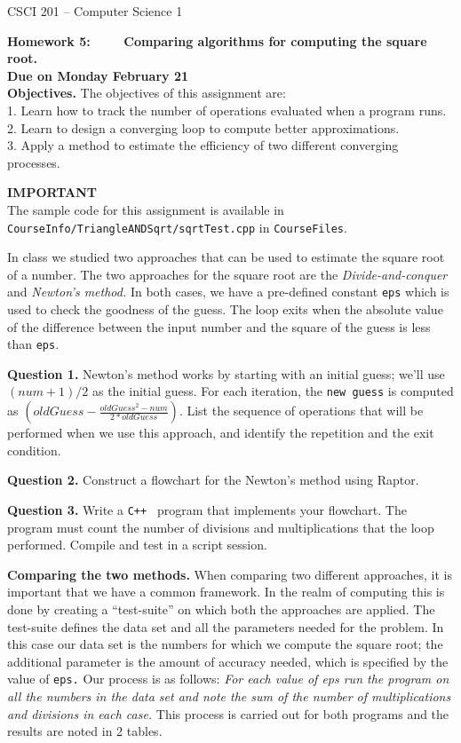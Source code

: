 \documentclass[11pt, psfig]{article}
\begin{document}


{\Large CSCI 201 -- Computer Science 1}



{\bf Homework 5:  \ \ \ \   Comparing algorithms for computing the square root.}\\
{\bf Due on Monday February 21}\\
{\bf Objectives.} {The objectives of this assignment are: \\ 1. Learn how to track the number of operations evaluated when a program runs.\\ 2. Learn to design a converging loop to compute better approximations. \\
3. Apply a method to estimate the efficiency of two different converging processes.} 

{\bf IMPORTANT} \\{ 
The sample code for this assignment is available in {\tt CourseInfo/TriangleANDSqrt/sqrtTest.cpp} in {\tt CourseFiles}.}

In class we studied two approaches that can be used to 
estimate the square root of a number.  
The two approaches for the square root are the {\em 
Divide-and-conquer} and {\em Newton's method.} In both cases, we have a 
pre-defined constant {\tt eps} which is used to check the goodness 
of the guess. The loop exits when the absolute value of the 
difference between the input number and the square of the guess is 
less than {\tt eps}.  

 
{\bf Question 1.} Newton's method works by starting with an initial guess; we'll use $(num+1)/2$ as the initial guess.
For each iteration,  the {\tt new guess} is computed as 
$(oldGuess - \frac{oldGuess^2-num}{2*oldGuess})$. List the sequence of operations 
that will be performed when we use this approach, and identify the repetition and 
the exit condition.

{\bf Question 2.} Construct a flowchart for the Newton's method using Raptor.


{\bf Question 3.}  Write a {\tt C++ } program that implements your
flowchart. The program must count the number of 
divisions and multiplications that the loop performed. Compile and test in a script session.

{\bf Comparing the   two methods.}  When comparing 
two different approaches, it is important that we have a common framework.
In the realm of computing this is done by creating a ``test-suite'' on 
which both the approaches are applied. The test-suite defines the data set 
and all the parameters needed for the problem. In this case our 
data set is the numbers for which we compute the square root; the additional 
parameter is the amount of accuracy needed, which is specified by the 
value of {\tt eps.} Our process is as follows: {\em For each value of eps
run the program on all the numbers in the data set and note  the sum of the
number of multiplications and divisions in each case.} This process is carried out  for 
both programs and the results are noted in 2 tables.
\end{document}
